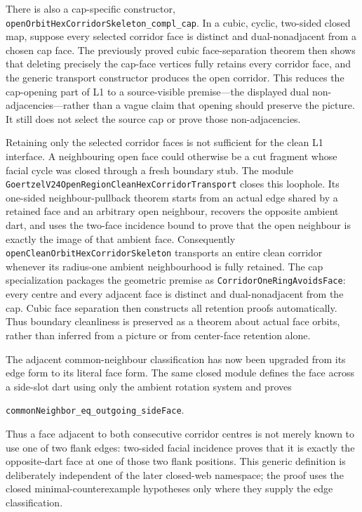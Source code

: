 \documentclass[11pt]{article}
\theoremstyle{definition}
\begin{document}
There is also a cap-specific constructor,
\texttt{openOrbitHexCorridorSkeleton\_compl\_cap}.  In a cubic, cyclic,
two-sided closed map, suppose every selected corridor face is distinct and
dual-nonadjacent from a chosen cap face.  The previously proved cubic
face-separation theorem then shows that deleting precisely the cap-face
vertices fully retains every corridor face, and the generic transport
constructor produces the open corridor.  This reduces the cap-opening part of
L1 to a source-visible premise---the displayed dual non-adjacencies---rather
than a vague claim that opening should preserve the picture.  It still does
not select the source cap or prove those non-adjacencies.

Retaining only the selected corridor faces is not sufficient for the clean
L1 interface.  A neighbouring open face could otherwise be a cut fragment
whose facial cycle was closed through a fresh boundary stub.  The module
\texttt{GoertzelV24OpenRegionCleanHexCorridorTransport} closes this loophole.
Its one-sided neighbour-pullback theorem starts from an actual edge shared by
a retained face and an arbitrary open neighbour, recovers the opposite
ambient dart, and uses the two-face incidence bound to prove that the open
neighbour is exactly the image of that ambient face.  Consequently
\texttt{openCleanOrbitHexCorridorSkeleton} transports an entire clean
corridor whenever its radius-one ambient neighbourhood is fully retained.
The cap specialization packages the geometric premise as
\texttt{CorridorOneRingAvoidsFace}: every centre and every adjacent face is
distinct and dual-nonadjacent from the cap.  Cubic face separation then
constructs all retention proofs automatically.  Thus boundary cleanliness is
preserved as a theorem about actual face orbits, rather than inferred from a
picture or from center-face retention alone.

The adjacent common-neighbour classification has now been upgraded from its
edge form to its literal face form.  The same closed module defines the face
across a side-slot dart using only the ambient rotation system and proves

\begin{center}
\texttt{commonNeighbor\_eq\_outgoing\_sideFace}.
\end{center}

Thus a face adjacent to both consecutive corridor centres is not merely known
to use one of two flank edges: two-sided facial incidence proves that it is
exactly the opposite-dart face at one of those two flank positions.  This
generic definition is deliberately independent of the later closed-web
namespace; the proof uses the closed minimal-counterexample hypotheses only
where they supply the edge classification.
\end{document}
